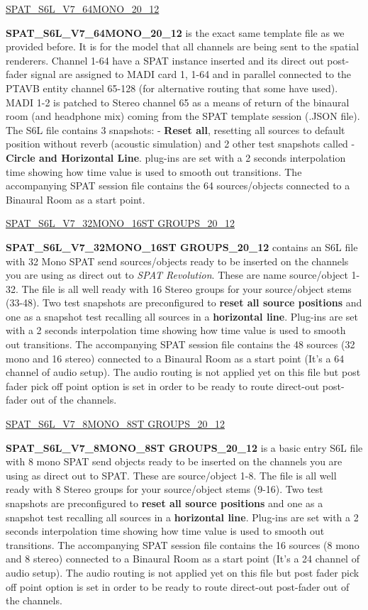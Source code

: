 \documentclass[
  letterpaper,
  DIV=11,
  numbers=noendperiod]{scrreport}
\begin{document}
\href{https://public.3.basecamp.com/p/2WqGPJ4ner3k3No1AtbYB6Gw}{SPAT\_S6L\_V7\_64MONO\_20\_12}

\textbf{SPAT\_S6L\_V7\_64MONO\_20\_12} is the exact same template file
as we provided before. It is for the model that all channels are being
sent to the spatial renderers. Channel 1-64 have a SPAT instance
inserted and its direct out post-fader signal are assigned to MADI card
1, 1-64 and in parallel connected to the PTAVB entity channel 65-128
(for alternative routing that some have used). MADI 1-2 is patched to
Stereo channel 65 as a means of return of the binaural room (and
headphone mix) coming from the SPAT template session (.JSON file). The
S6L file contains 3 snapshots: - \textbf{Reset all}, resetting all
sources to default position without reverb (acoustic simulation) and 2
other test snapshots called - \textbf{Circle and Horizontal Line}.
plug-ins are set with a 2 seconds interpolation time showing how time
value is used to smooth out transitions. The accompanying SPAT session
file contains the 64 sources/objects connected to a Binaural Room as a
start point.

\href{https://public.3.basecamp.com/p/UQU8nhgHxy3FUjVgPndb8baK}{SPAT\_S6L\_V7\_32MONO\_16ST
GROUPS\_20\_12}

\textbf{SPAT\_S6L\_V7\_32MONO\_16ST GROUPS\_20\_12} contains an S6L file
with 32 Mono SPAT send sources/objects ready to be inserted on the
channels you are using as direct out to \emph{SPAT Revolution}. These
are name source/object 1-32. The file is all well ready with 16 Stereo
groups for your source/object stems (33-48). Two test snapshots are
preconfigured to \textbf{reset all source positions} and one as a
snapshot test recalling all sources in a \textbf{horizontal line}.
Plug-ins are set with a 2 seconds interpolation time showing how time
value is used to smooth out transitions. The accompanying SPAT session
file contains the 48 sources (32 mono and 16 stereo) connected to a
Binaural Room as a start point (It's a 64 channel of audio setup). The
audio routing is not applied yet on this file but post fader pick off
point option is set in order to be ready to route direct-out post-fader
out of the channels.

\href{https://public.3.basecamp.com/p/EjezQzaYqtVWuwiqqZrJzNPd}{SPAT\_S6L\_V7\_8MONO\_8ST
GROUPS\_20\_12}

\textbf{SPAT\_S6L\_V7\_8MONO\_8ST GROUPS\_20\_12} is a basic entry S6L
file with 8 mono SPAT send objects ready to be inserted on the channels
you are using as direct out to SPAT. These are source/object 1-8. The
file is all well ready with 8 Stereo groups for your source/object stems
(9-16). Two test snapshots are preconfigured to \textbf{reset all source
positions} and one as a snapshot test recalling all sources in a
\textbf{horizontal line}. Plug-ins are set with a 2 seconds
interpolation time showing how time value is used to smooth out
transitions. The accompanying SPAT session file contains the 16 sources
(8 mono and 8 stereo) connected to a Binaural Room as a start point
(It's a 24 channel of audio setup). The audio routing is not applied yet
on this file but post fader pick off point option is set in order to be
ready to route direct-out post-fader out of the channels.
\end{document}
